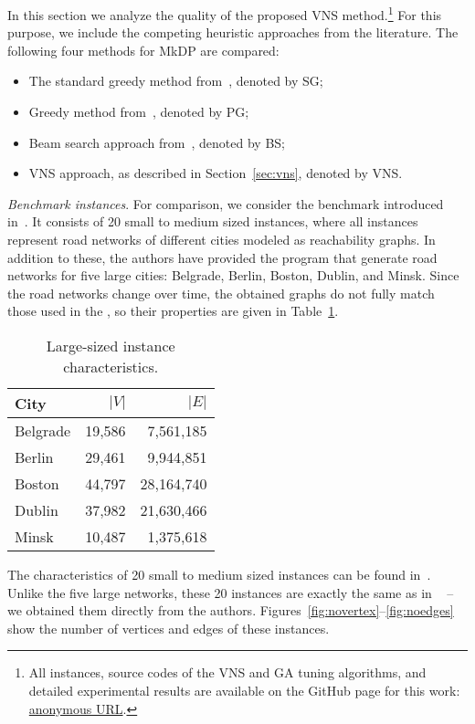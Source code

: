 \documentclass[dvipsnames,format=sigconf,anonymous=true,review=true]{acmart}
\begin{document}
In this section we analyze the quality of the proposed VNS method.\footnote{All instances, source codes of the VNS and GA tuning algorithms, and detailed experimental results are available on the GitHub page for this work: \url{anonymous URL}.} For this purpose, we include the competing heuristic approaches from the literature. The following four methods for MkDP are compared:  

\begin{itemize}
	\item The standard greedy method from~\cite{parekh1991analysis,gagarin2013randomized}, denoted by SG;
	\item Greedy method from~\cite{gagarin2018multiple}, denoted by PG;
	\item Beam search approach from~\cite{corcoran2021heuristics}, denoted by BS;
	\item VNS approach, as described in Section~\ref{sec:vns}, denoted by VNS.  
\end{itemize}


\emph{Benchmark instances}. For comparison, we consider the benchmark introduced in~\cite{corcoran2021heuristics}. It consists of 20 small to medium sized instances, where all instances represent road networks of different cities modeled as reachability graphs. In addition to these, the authors have provided the program that generate road networks for five large cities: Belgrade, Berlin, Boston, Dublin, and Minsk. Since the road networks change over time, the obtained graphs do not fully match those used in the \cite{corcoran2021heuristics}, so their properties are given in Table~\ref{tab:big_instances_chars}.  
 
 \begin{table}
 	\caption{Large-sized instance characteristics.}
 	\label{tab:big_instances_chars}  
 	\begin{tabular}{lrr}
 		City      & $|V|$ & $|E|$ \\ \hline
 		Belgrade      & 19,586 & 7,561,185  \\ 
 		Berlin        & 29,461 & 9,944,851 \\
 	    Boston        & 44,797 & 28,164,740 \\
 	    Dublin        & 37,982 & 21,630,466 \\
 	    Minsk         & 10,487 & 1,375,618 \\ \hline
 	\end{tabular}
 \end{table}
 
 The characteristics of 20 small to medium sized instances can be found in~\cite{corcoran2021heuristics}.
 Unlike the five large networks, these 20 instances are exactly the same as in ~\cite{corcoran2021heuristics} -- we obtained them directly from the authors.
Figures~\ref{fig:novertex}--\ref{fig:noedges} show the number of vertices and edges of these instances.  
\end{document}
